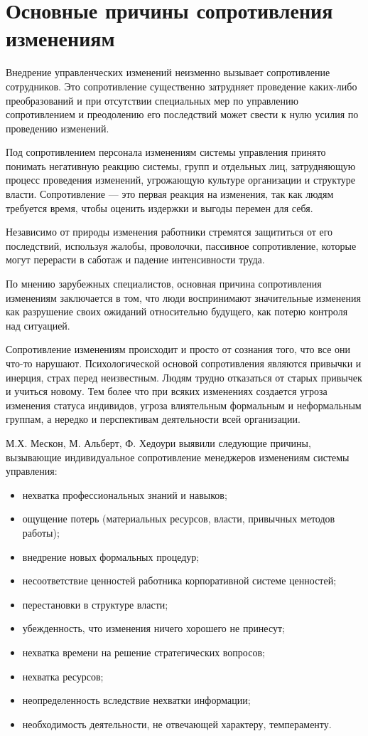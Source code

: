 \section{Основные причины сопротивления изменениям}

Внедрение управленческих изменений неизменно вызывает сопротивление сотрудников. Это сопротивление существенно затрудняет проведение каких-либо преобразований и при отсутствии специальных мер по управлению сопротивлением и преодолению его последствий может свести к нулю усилия по проведению изменений.

Под сопротивлением персонала изменениям системы управления принято понимать негативную реакцию системы, групп и отдельных лиц, затрудняющую процесс проведения изменений, угрожающую культуре организации и структуре власти. Сопротивление — это первая реакция на изменения, так как людям требуется время, чтобы оценить издержки и выгоды перемен для себя.

Независимо от природы изменения работники стремятся защититься от его последствий, используя жалобы, проволочки, пассивное сопротивление, которые могут перерасти в саботаж и падение интенсивности труда.

По мнению зарубежных специалистов, основная причина сопротивления изменениям заключается в том, что люди воспринимают значительные изменения как разрушение своих ожиданий относительно будущего, как потерю контроля над ситуацией.

Сопротивление изменениям происходит и просто от сознания того, что все они что-то нарушают. Психологической основой сопротивления являются привычки и инерция, страх перед неизвестным.
Людям трудно отказаться от старых привычек и учиться новому.
Тем более что при всяких изменениях создается угроза изменения статуса индивидов, угроза влиятельным формальным и неформальным группам, а нередко и перспективам деятельности всей организации.

М.Х. Мескон, М. Альберт, Ф. Хедоури выявили следующие причины, вызывающие индивидуальное сопротивление менеджеров изменениям системы управления:
\begin{itemize}
	\item нехватка профессиональных знаний и навыков;
\item ощущение потерь (материальных ресурсов, власти, привычных методов работы);
\item внедрение новых формальных процедур;
\item несоответствие ценностей работника корпоративной системе ценностей;
\item перестановки в структуре власти;
\item убежденность, что изменения ничего хорошего не принесут;
\item нехватка времени на решение стратегических вопросов;
\item нехватка ресурсов;
\item неопределенность вследствие нехватки информации;
\item необходимость деятельности, не отвечающей характеру, темпераменту.
\end{itemize}

